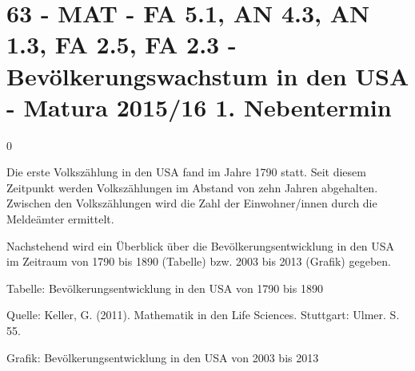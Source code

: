 \section{63 - MAT - FA 5.1, AN 4.3, AN 1.3, FA 2.5, FA 2.3 - Bevölkerungswachstum in den USA - Matura 2015/16 1. Nebentermin}

\begin{langesbeispiel} \item[0] %
	
Die erste Volkszählung in den USA fand im Jahre 1790 statt. Seit diesem Zeitpunkt werden Volkszählungen im Abstand von zehn Jahren abgehalten. Zwischen den Volkszählungen wird die Zahl der Einwohner/innen durch die Meldeämter ermittelt.

Nachstehend wird ein Überblick über die Bevölkerungsentwicklung in den USA im Zeitraum von 1790 bis 1890 (Tabelle) bzw. 2003 bis 2013 (Grafik) gegeben.

Tabelle: Bevölkerungsentwicklung in den USA von 1790 bis 1890


\begin{scriptsize}Quelle: Keller, G. (2011). Mathematik in den Life Sciences. Stuttgart: Ulmer. S. 55.\end{scriptsize}

Grafik: Bevölkerungsentwicklung in den USA von 2003 bis 2013


\end{langesbeispiel}

